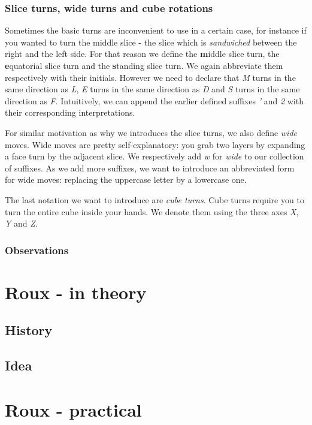 \documentclass{scrreprt}
\begin{document}
\subsection{Slice turns, wide turns and cube rotations}
Sometimes the basic turns are inconvenient to use in a certain case, for instance if you wanted to turn the middle slice - the slice which is \emph{sandwiched} between the right and the left side. For that reason we define the \textbf{m}iddle slice turn, the \textbf{e}quatorial slice turn and the \textbf{s}tanding slice turn. We again abbreviate them respectively with their initials. However we need to declare that \emph{M} turns in the same direction as \emph{L}, \emph{E} turns in the same direction as \emph{D} and \emph{S} turns in the same direction as \emph{F}. Intuitively, we can append the earlier defined suffixes \emph{'} and \emph{2} with their corresponding interpretations.\par
For similar motivation as why we introduces the slice turns, we also define \emph{wide} moves. Wide moves are pretty self-explanatory: you grab two layers by expanding a face turn by the adjacent slice. We respectively add \emph{w} for \emph{wide} to our collection of suffixes. As we add more suffixes, we want to introduce an abbreviated form for wide moves: replacing the uppercase letter by a lowercase one.\par
The last notation we want to introduce are \emph{cube turns}. Cube turns require you to turn the entire cube inside your hands. We denote them using the three axes \emph{X}, \emph{Y} and \emph{Z}.

\subsection{Observations}

\chapter{Roux - in theory}

\section{History}

\section{Idea}
\chapter{Roux - practical}
\end{document}

